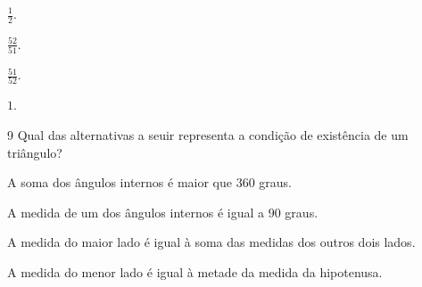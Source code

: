 \begin{escolha}
\item $\frac{1}{2}$.
\item $\frac{52}{51}$.
\item $\frac{51}{52}$.
\item $1$.
\end{escolha}



\num{9}  Qual das alternativas a seuir representa a condição de existência de
um triângulo?

\begin{escolha}
\item A soma dos ângulos internos é maior que $360$ graus. 
\item A medida de um
dos ângulos internos é igual a $90$ graus. 
\item A medida do maior lado é
igual à soma das medidas dos outros dois lados. 
\item A medida do menor
lado é igual à metade da medida da hipotenusa.
\end{escolha}


